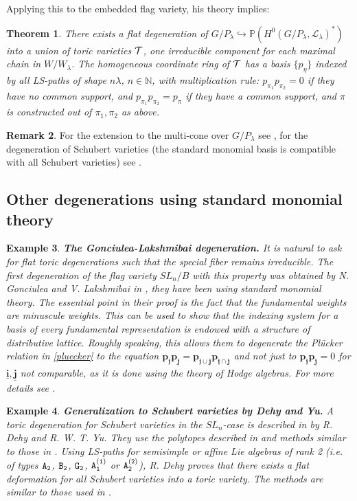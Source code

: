 \documentclass{emsprocart}
\newtheorem{theorem}{Theorem}[section]
\newtheorem{example}[theorem]{Example}
\theoremstyle{definition}
\newtheorem{remark}[theorem]{Remark}
\begin{document}
Applying this to the embedded flag variety, his theory implies:
\begin{theorem}%
There exists a flat degeneration of $G/P_\lambda\hookrightarrow \mathbb P(H^0(G/P_\lambda,\mathcal L_{\lambda})^*)$
into a union of toric varieties $\cal T$, one irreducible component for each maximal chain in $W/W_\lambda$.
The homogeneous coordinate ring of $\cal T$ has a basis $\{p_\eta\}$ indexed by all LS-paths of shape
$n\lambda$, $n\in\mathbb N$, with multiplication rule: $p_{\pi_1}p_{\pi_2}=0$ if they have no common support,
and $p_{\pi_1}p_{\pi_2}=p_\pi$ if they have a common support, and $\pi$ is constructed out of $\pi_1,\pi_2$ as above.
\end{theorem}
\begin{remark}
For the extension to the multi-cone over $G/P_\lambda$ see \cite{Ch1},
for the degeneration of Schubert varieties (the standard monomial basis is compatible with
all Schubert varieties) see  \cite{Ch1,Ch2}.
\end{remark}
\subsection{Other degenerations using standard monomial theory}
\begin{example}\label{GonLak}
{\bf The Gonciulea-Lakshmibai degeneration.} \rm
It is natural to ask for flat toric degenerations such that the special fiber
remains irreducible.  The first degeneration of the flag variety $SL_n/B$ with this property was obtained by N. Gonciulea and V. Lakshmibai
in \cite{GL}, they have been using standard monomial theory. The essential point
in their proof is the fact that the fundamental weights
are minuscule weights. This can be used to show that the indexing system for a basis of every
fundamental representation is endowed with a structure of distributive lattice. Roughly speaking, this allows them to
degenerate the Pl\"ucker relation in \eqref{pluecker} to the equation
$\mathbf{p}_{\underline{\mathbf i}}\mathbf{p}_{\underline{\mathbf j}}=\mathbf{p}_{\underline{\mathbf i}\cup \underline{\mathbf j}} \mathbf{p}_{\underline{\mathbf i}\cap \underline{\mathbf j}}$
and not just to $\mathbf{p}_{\underline{\mathbf i}}\mathbf{p}_{\underline{\mathbf j}}=0$ for $\underline{\mathbf i},\underline{\mathbf j}$ not comparable,
as it is done using the theory of Hodge algebras.
For more details see \cite{GL}.
\end{example}
\begin{example} {\bf Generalization to Schubert varieties by Dehy and Yu.} \rm
A toric degeneration for Schubert varieties in the $SL_n$-case is described in \cite{DY2} by R. Dehy and R. W. T. Yu.
They use the polytopes described in \cite{DY1} and methods similar to those in \cite{GL}.
Using LS-paths for semisimple or affine Lie algebras of rank 2 (i.e. of types $\tt A_2$, $\tt B_2$, $\tt G_2$, $\tt A^{(1)}_1$ or $\tt A^{(2)}_2$),
R. Dehy \cite{De} proves that there exists a flat deformation for all Schubert varieties into a toric variety.
The methods are similar to those
used in \cite{DY2}.
\end{example}
\end{document}
